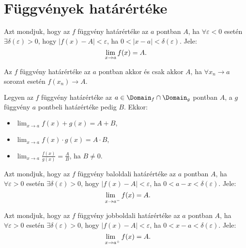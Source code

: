 \section{Függvények határértéke}

\begin{definition}
  Azt mondjuk, hogy az $f$ függvény határértéke az $a$ pontban $A$, ha $\forall
    \varepsilon < 0$ esetén $\exists \delta(\varepsilon) > 0$, hogy $|f(x) - A|
    < \varepsilon$, ha $0 < |x - a| < \delta(\varepsilon)$. Jele:
  \[
    \lim_{x \rightarrow a} f(x) = A
    \text.
  \]
\end{definition}

\begin{theorem}
  Az $f$ függvény határértéke az $a$ pontban akkor és csak akkor $A$, ha
  $\forall x_n \rightarrow a$ sorozat esetén $f(x_n) \rightarrow A$.
\end{theorem}

\begin{theorem}
  Legyen az $f$ függvény határértéke az $a \in \Domain_f \cap \Domain_g$ pontban
  $A$, a $g$ függvény $a$ pontbeli határértéke pedig $B$. Ekkor:
  \begin{itemize}
    \item $\displaystyle \lim_{x \rightarrow a} f(x) + g(x) = A + B$,
    \item $\displaystyle \lim_{x \rightarrow a} f(x) \cdot g(x) = A \cdot B$,
    \item $\displaystyle \lim_{x \rightarrow a} \frac{f(x)}{g(x)} = \frac{A}{B}$,
          ha  $B \neq 0$.
  \end{itemize}
\end{theorem}

\begin{definition}
  Azt mondjuk, hogy az $f$ függvény baloldali határértéke az $a$ pontban $A$, ha
  $\forall \varepsilon > 0$ esetén $\exists \delta(\varepsilon) > 0$, hogy
  $|f(x) - A| < \varepsilon$, ha $0 < a - x < \delta(\varepsilon)$. Jele:
  \[
    \lim_{\phantom{{}^-}x \rightarrow a^-} f(x) = A
    \text.
  \]
\end{definition}

\begin{definition}
  Azt mondjuk, hogy az $f$ függvény jobboldali határértéke az $a$ pontban $A$,
  ha $\forall \varepsilon > 0$ esetén $\exists \delta(\varepsilon) > 0$, hogy
  $|f(x) - A| < \varepsilon$, ha $0 < x - a < \delta(\varepsilon)$.
  Jele:
  \[
    \lim_{\phantom{{}^+}x \rightarrow a^+} f(x) = A
    \text.
  \]
\end{definition}

